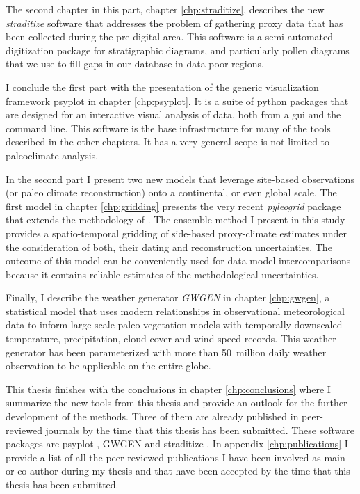 \begin{refsection}
The second chapter in this part, chapter \ref{chp:straditize}, describes the new \textit{straditize} software that addresses the problem of gathering proxy data that has been collected during the pre-digital area. This software is a semi-automated digitization package for stratigraphic diagrams, and particularly pollen diagrams that we use to fill gaps in our database in data-poor regions.

I conclude the first part with the presentation of the generic visualization framework psyplot in chapter \ref{chp:psyplot}. It is a suite of python packages that are designed for an interactive visual analysis of data, both from a \gls{gui} and the command line. This software is the base infrastructure for many of the tools described in the other chapters. It has a very general scope is not limited to paleoclimate analysis.

In the \hyperref[part:models]{second part} I present two new models that leverage site-based observations (or paleo climate reconstruction) onto a continental, or even global scale. The first model in chapter \ref{chp:gridding} presents the very recent \textit{pyleogrid} package that extends the methodology of \citep{MauriDavisCollinsEtAl2015}. The ensemble method I present in this study provides a spatio-temporal gridding of side-based proxy-climate estimates under the consideration of both, their dating and reconstruction uncertainties. The outcome of this model can be conveniently used for data-model intercomparisons because it contains reliable estimates of the methodological uncertainties.

Finally, I describe the weather generator \textit{GWGEN} in chapter \ref{chp:gwgen}, a statistical model that uses modern relationships in observational meteorological data to inform large-scale paleo vegetation models with temporally downscaled temperature, precipitation, cloud cover and wind speed records. This weather generator has been parameterized with more than 50~million daily weather observation to be applicable on the entire globe.

This thesis finishes with the conclusions in chapter \ref{chp:conclusions} where I summarize the new tools from this thesis and provide an outlook for the further development of the methods. Three of them are already published in peer-reviewed journals by the time that this thesis has been submitted. These software packages are psyplot \citep{Sommer2017}, GWGEN \citep{SommerKaplan2017b} and straditize \citep{SommerRechChevalierEtAl2019}. In appendix \ref{chp:publications} I provide a list of all the peer-reviewed publications I have been involved as main or co-author during my thesis and that have been accepted by the time that this thesis has been submitted.

\printbibliography[heading=subbibintoc]

\end{refsection}
